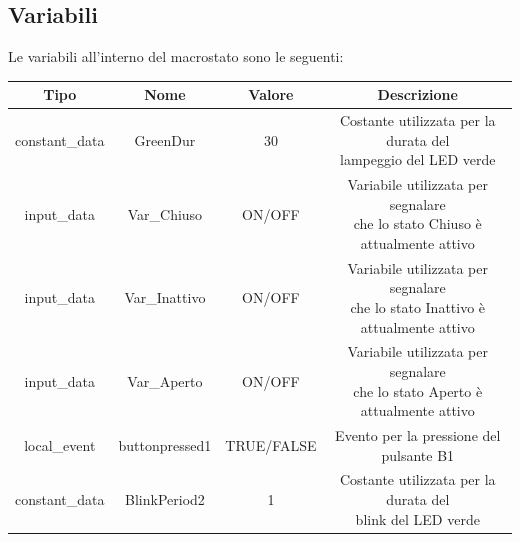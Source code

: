         \subsection{Variabili}
            Le variabili all'interno del macrostato sono le seguenti:
            
            \begin{table}[H]
                \centering
                    \begin{tabular}{ | c | c | c | c |} 
                        \hline
                        
                        \textbf{Tipo} & \textbf{Nome} & \textbf{Valore} & \textbf{Descrizione} \\ 
                        \hline
                        
                        constant\_data & GreenDur & 30 & \makecell{Costante utilizzata per la durata del \\ lampeggio del LED verde} \\ 
                        \hline
                        
                        input\_data & Var\_Chiuso & ON/OFF & \makecell{Variabile utilizzata per segnalare \\ che lo stato Chiuso è attualmente attivo} \\ 
                        \hline
                        
                        input\_data & Var\_Inattivo & ON/OFF & \makecell{Variabile utilizzata per segnalare \\ che lo stato Inattivo è attualmente attivo} \\ 
                        \hline
                        
                        input\_data & Var\_Aperto & ON/OFF & \makecell{Variabile utilizzata per segnalare \\ che lo stato Aperto è attualmente attivo} \\ 
                        \hline
                        
                        local\_event & buttonpressed1 & TRUE/FALSE & Evento per la pressione del pulsante B1 \\ 
                        \hline
                        
                        constant\_data & BlinkPeriod2 & 1 & \makecell{Costante utilizzata per la durata del \\ blink del LED verde} \\ 
                        \hline
                        

\end{tabular}
\end{table}
